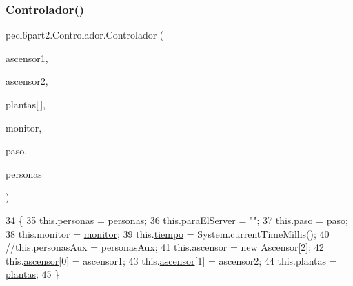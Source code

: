 \subsubsection{\texorpdfstring{Controlador()}{Controlador()}}
{\footnotesize\ttfamily pecl6part2.\+Controlador.\+Controlador (\begin{DoxyParamCaption}\item[{\mbox{\hyperlink{classpecl6part2_1_1_ascensor}{Ascensor}}}]{ascensor1,  }\item[{\mbox{\hyperlink{classpecl6part2_1_1_ascensor}{Ascensor}}}]{ascensor2,  }\item[{\mbox{\hyperlink{classpecl6part2_1_1_planta}{Planta}}}]{plantas\mbox{[}$\,$\mbox{]},  }\item[{\mbox{\hyperlink{classpecl6part2_1_1_monitor}{Monitor}}}]{monitor,  }\item[{\mbox{\hyperlink{classpecl6part2_1_1_paso}{Paso}}}]{paso,  }\item[{Array\+List$<$ \mbox{\hyperlink{classpecl6part2_1_1_persona}{Persona}} $>$}]{personas }\end{DoxyParamCaption})\hspace{0.3cm}{\ttfamily [inline]}}


\begin{DoxyCode}
34     \{
35         this.\mbox{\hyperlink{classpecl6part2_1_1_controlador_a570bc37c2db22f144af250ceccbbab6d}{personas}} = \mbox{\hyperlink{classpecl6part2_1_1_controlador_a570bc37c2db22f144af250ceccbbab6d}{personas}};
36         this.\mbox{\hyperlink{classpecl6part2_1_1_controlador_a239e662ed9f4ba0e12f81e47f3f2773f}{paraElServer}} = \textcolor{stringliteral}{""};
37         this.paso = \mbox{\hyperlink{classpecl6part2_1_1_controlador_ae07ed4d274035a923387361c19e5ce79}{paso}};
38         this.monitor = \mbox{\hyperlink{classpecl6part2_1_1_controlador_a7fc29467f824a892431dc36c908857c7}{monitor}};
39         this.\mbox{\hyperlink{classpecl6part2_1_1_controlador_af7664f9bfe62befb34d430f513b96c98}{tiempo}} = System.currentTimeMillis();
40         \textcolor{comment}{//this.personasAux = personasAux;}
41         this.\mbox{\hyperlink{classpecl6part2_1_1_controlador_ac2f7c4abd5447ea5daeeb7d62bf3f591}{ascensor}} = \textcolor{keyword}{new} \mbox{\hyperlink{classpecl6part1_1_1_ascensor}{Ascensor}}[2];
42         this.\mbox{\hyperlink{classpecl6part2_1_1_controlador_ac2f7c4abd5447ea5daeeb7d62bf3f591}{ascensor}}[0] = ascensor1;
43         this.\mbox{\hyperlink{classpecl6part2_1_1_controlador_ac2f7c4abd5447ea5daeeb7d62bf3f591}{ascensor}}[1] = ascensor2;
44         this.plantas = \mbox{\hyperlink{classpecl6part2_1_1_controlador_a7706d274fde82fed01a03a619fbcd77c}{plantas}};
45     \}
\end{DoxyCode}


